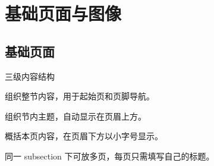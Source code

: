 \section{基础页面与图像}
\subsection{基础页面}





\begin{frame}{三级内容结构}
      \begin{description}[Subsection]
            \item[Section] 组织整节内容，用于起始页和页脚导航。
            \item[Subsection] 组织节内主题，自动显示在页眉上方。
            \item[Frametitle] 概括本页内容，在页眉下方以小字号显示。
            \item[连续页面] 同一 subsection 下可放多页，每页只需填写自己的标题。
      \end{description}
\end{frame}





